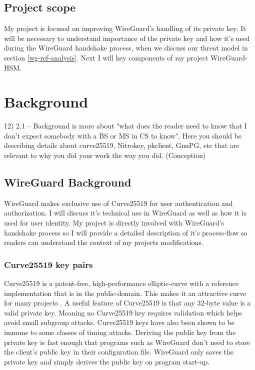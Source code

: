 \documentclass [11pt, proquest] {uwthesis}[2020/02/24]
\begin{document}
\section {Project scope}

My project is focused on improving WireGuard's handling of its private key.
It will be necessary to understand importance of the private key and how it's used during the WireGuard handshake process, when we discuss our threat model in section \ref{wg-ref-analysis}. Next I will key components of my project WireGuard-HSM.


\chapter {Background}
12)  2.1 -- Background is more about "what does the reader need to know that I don't expect somebody with a BS or MS in CS to know". Here you should be describing details about curve25519, Nitrokey, pkclient, GnuPG, etc that are relevant to why you did your work the way you did. (Conception)
\section {WireGuard Background}  \label{background}
WireGuard makes exclusive use of Curve25519 for user authentication and authorization. I will discuss it's technical use in WireGuard as well as how it is used for user identity. My project is directly involved with WireGuard's handshake process so I will provide a detailed description of it's process-flow so readers can understand the context of my projects modifications.

\subsection{Curve25519 key pairs} \label{x25519}
Curve25519 is a patent-free, high-performance elliptic-curve with a reference implementation that is in the public-domain. This makes it an attractive curve for many projects \cite{noauthor_things_2022}.
A useful feature of Curve25519 is that any 32-byte value is a valid private key. Meaning no Curve25519 key requires validation which helps avoid small subgroup attacks. Curve25519 keys have also been shown to be immune to some classes of timing attacks\cite{noauthor_safecurves_2022}\cite{sasdrich_implementing_2015}.  Deriving the public key from the private key is fast enough that programs such as WireGuard don't need to store the client's public key in their configuration file. WireGuard only saves the private key and simply derives the public key on program start-up.
\end{document}
